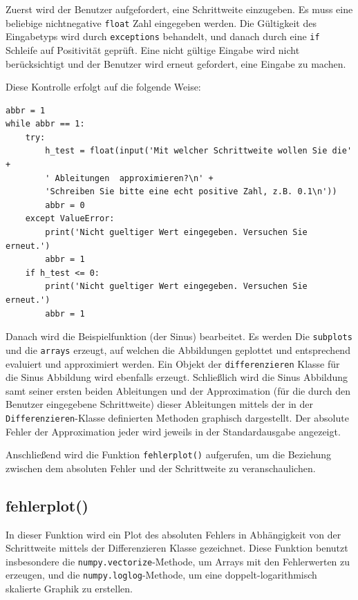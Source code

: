 \documentclass[smallheadings]{scrartcl}
\begin{document}
Zuerst wird der Benutzer aufgefordert, eine Schrittweite einzugeben. Es muss eine beliebige nichtnegative \texttt{float} Zahl eingegeben werden. Die Gültigkeit des Eingabetyps wird durch \texttt{exceptions} behandelt, und danach durch eine \texttt{if} Schleife auf Positivität geprüft. Eine nicht gültige Eingabe wird nicht berücksichtigt  und der Benutzer wird erneut gefordert, eine Eingabe zu machen.

Diese Kontrolle erfolgt auf die folgende Weise:

\begin{lstlisting}
abbr = 1 
while abbr == 1: 
    try:
        h_test = float(input('Mit welcher Schrittweite wollen Sie die' + 
        ' Ableitungen  approximieren?\n' +
        'Schreiben Sie bitte eine echt positive Zahl, z.B. 0.1\n'))
        abbr = 0
    except ValueError:
        print('Nicht gueltiger Wert eingegeben. Versuchen Sie erneut.')
        abbr = 1
    if h_test <= 0:
        print('Nicht gueltiger Wert eingegeben. Versuchen Sie erneut.')
        abbr = 1
\end{lstlisting}

Danach wird die Beispielfunktion (der Sinus) bearbeitet. Es werden Die \texttt{subplots} und die \texttt{arrays} erzeugt, auf welchen die Abbildungen geplottet und entsprechend evaluiert und approximiert werden. Ein Objekt der \texttt{differenzieren} Klasse für die Sinus Abbildung wird ebenfalls erzeugt.  Schließlich wird die Sinus Abbildung samt seiner  ersten beiden Ableitungen
und der Approximation (für die durch den Benutzer eingegebene Schrittweite) dieser Ableitungen mittels der in der \texttt{Differenzieren}-Klasse definierten Methoden graphisch dargestellt. Der absolute Fehler der Approximation jeder wird jeweils in der Standardausgabe angezeigt.

Anschließend wird die Funktion \texttt{fehlerplot()} aufgerufen, um die Beziehung zwischen dem absoluten Fehler und der Schrittweite zu veranschaulichen. 

\subsection{fehlerplot()}

In dieser Funktion wird ein Plot des absoluten Fehlers in Abhängigkeit von der Schrittweite mittels der Differenzieren Klasse gezeichnet. Diese Funktion benutzt insbesondere die \texttt{numpy.vectorize}-Methode, um Arrays mit den Fehlerwerten zu erzeugen, und die \texttt{numpy.loglog}-Methode, um eine doppelt-logarithmisch skalierte Graphik zu erstellen.
\end{document}
